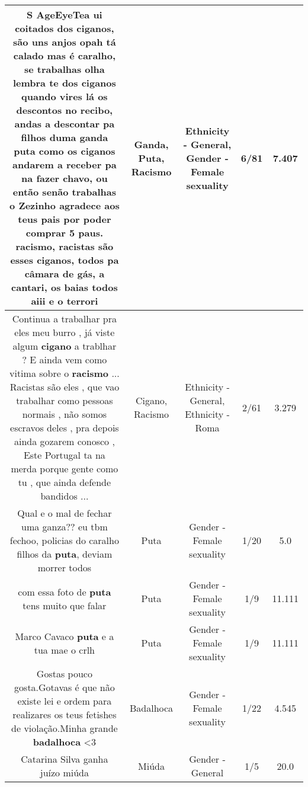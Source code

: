 \documentclass[11pt]{article}
\newlength\mylength
\begin{document}
\begin{center}
\begin{longtable}{|C{.65\mylength}|C{.30\mylength}|C{.12\mylength}|C{.12\mylength}|C{.12\mylength}|}
  \small S AgeEyeTea  ui coitados dos ciganos, são uns anjos opah tá calado mas é caralho, se trabalhas olha lembra te dos ciganos quando vires lá os descontos no recibo, andas a descontar pa filhos duma \textbf{ganda} \textbf{puta} como os ciganos andarem a receber pa na fazer chavo, ou então senão trabalhas o Zezinho agradece aos teus pais por poder comprar 5 paus. \textbf{racismo}, racistas são esses ciganos, todos pa câmara de gás, a cantari,  os baias todos  aiii e o terrori\normalsize   & Ganda, Puta, Racismo & Ethnicity - General, Gender - Female sexuality & 6/81 & 7.407 \\  \hline
  \small Continua a trabalhar pra eles meu burro , já viste algum \textbf{cigano} a trablhar ? E ainda vem como vitima sobre o \textbf{racismo} ... Racistas são eles , que vao trabalhar como pessoas normais , não somos escravos deles , pra depois ainda gozarem conosco , Este Portugal ta na merda porque gente como tu , que ainda defende bandidos ...\normalsize   & Cigano, Racismo & Ethnicity - General, Ethnicity - Roma & 2/61 & 3.279 \\  \hline
  \small Qual e o mal de fechar uma ganza?? eu tbm fechoo, policias do caralho filhos da \textbf{puta}, deviam morrer todos\normalsize   & Puta & Gender - Female sexuality & 1/20 & 5.0 \\  \hline
  \small com essa foto de \textbf{puta} tens muito que falar\normalsize   & Puta & Gender - Female sexuality & 1/9 & 11.111 \\  \hline
  \small Marco Cavaco \textbf{puta} e a tua mae o crlh\normalsize   & Puta & Gender - Female sexuality & 1/9 & 11.111 \\  \hline
  \small Gostas pouco gosta.Gotavas é que não existe lei e ordem para realizares os teus fetishes de violação.Minha grande \textbf{badalhoca} <3\normalsize   & Badalhoca & Gender - Female sexuality & 1/22 & 4.545 \\  \hline
  \small Catarina Silva ganha juízo miúda\normalsize   & Miúda & Gender - General & 1/5 & 20.0 \\  \hline

\end{longtable}
\end{center}
\end{document}
